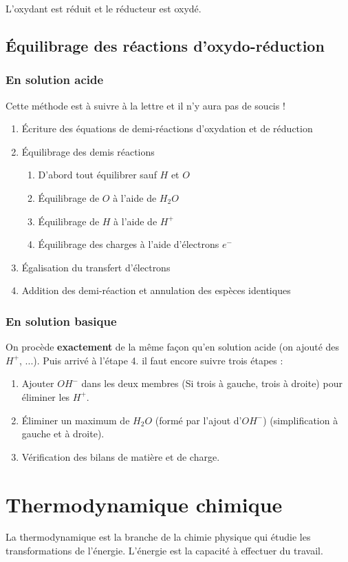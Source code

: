 \documentclass[british,french,11pt, a4paper, openany]{book}
\begin{document}
L'oxydant est réduit et le réducteur est oxydé.

\section{Équilibrage des réactions d'oxydo-réduction}
\subsection{En solution acide}
Cette méthode est à suivre à la lettre et il n'y aura pas de soucis ! 
\begin{enumerate}
	\item Écriture des équations de demi-réactions d'oxydation et de réduction
	\item Équilibrage des demis réactions
	      \begin{enumerate}
	      	\item D'abord tout équilibrer sauf $H$ et $O$
	      	\item Équilibrage de $O$ à l'aide de $H_2O$
	      	\item Équilibrage de $H$ à l'aide de $H^+$
	      	\item Équilibrage des charges à l'aide d'électrons $e^-$
	      \end{enumerate}
	\item Égalisation du transfert d'électrons
	\item Addition des demi-réaction et annulation des espèces identiques
\end{enumerate}

\subsection{En solution basique}
On procède \textbf{exactement} de la même façon qu'en solution acide (on ajouté des $H^+$, ...). Puis arrivé à l'étape 4. il faut encore suivre trois étapes : \\
\begin{enumerate}
	\item Ajouter $OH^-$ dans les deux membres (Si trois à gauche, trois à droite) pour éliminer les $H^+$.
	\item Éliminer un maximum de $H_2O$ (formé par l'ajout d'$OH^-$) (simplification à gauche et à droite).
	\item Vérification des bilans de matière et de charge.
\end{enumerate}

\newpage
\chapter{Thermodynamique chimique}
La thermodynamique est la branche de la chimie physique qui étudie les transformations de l'énergie. L'énergie est la capacité à effectuer du travail.
\end{document}
